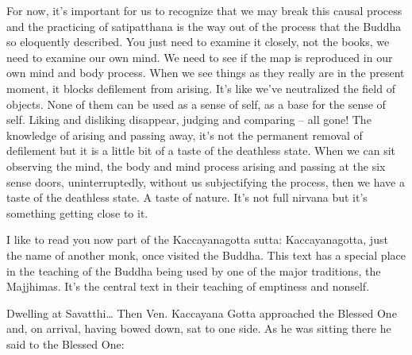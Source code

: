 \documentclass[letterpaper,10pt,english]{sphinxmanual}
\begin{document}
\sphinxAtStartPar
For now, it’s important for us to recognize that we may break this causal
process and the practicing of satipatthana is the way out of the process that
the Buddha so eloquently described. You just need to examine it closely, not
the books, we need to examine our own mind. We need to see if the map is
reproduced in our own mind and body process. When we see things as they
really are in the present moment, it blocks defilement from arising. It’s like
we’ve neutralized the field of objects. None of them can be used as a sense
of self, as a base for the sense of self. Liking and disliking disappear, judging   and comparing – all gone! The knowledge of arising and passing away,
it’s not the permanent removal of defilement but it is a little bit of a taste of
the deathless state. When we can sit observing the mind, the body and mind
process arising and passing at the six sense doors, uninterruptedly, without
us subjectifying the process, then we have a taste of the deathless state. A
taste of nature. It’s not full nirvana but it’s something getting close to it.

\sphinxAtStartPar
I like to read you now part of the Kaccayanagotta sutta: Kaccayanagotta, just the name of another monk, once visited the Buddha. This text has
a special place in the teaching of the Buddha being used by one of the major
traditions, the Majjhimas. It’s the central text in their teaching of emptiness
and non\sphinxhyphen{}self.

\sphinxAtStartPar
Dwelling  at  Savatthi…  Then  Ven.  Kaccayana  Gotta  approached  the
Blessed One and, on arrival, having bowed down, sat to one side. As he was
sitting there he said to the Blessed One:

\sphinxAtStartPar
{}

\sphinxAtStartPar
{}
\end{document}
